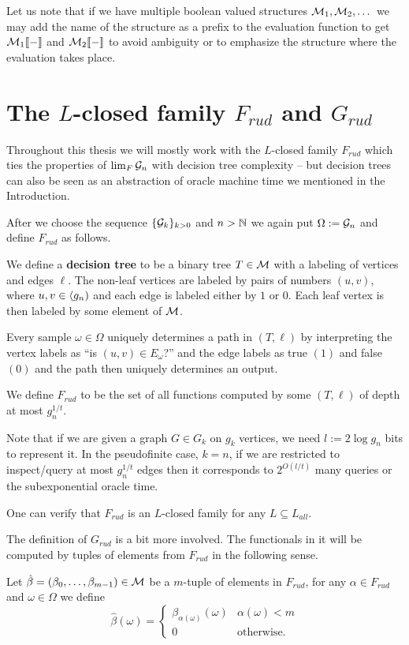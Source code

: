 Let us note that if we have multiple boolean valued structures $\mathcal{M}_1,\mathcal{M}_2,\dots$ we may add the name of the structure as a prefix to the evaluation function to get $\mathcal{M}_1\llbracket-\rrbracket$ and $\mathcal{M}_2\llbracket-\rrbracket$ to avoid ambiguity or to emphasize the structure where the evaluation takes place.
 
\section{The $L$-closed family $F_{rud}$ and $G_{rud}$}\label{secFrud}

Throughout this thesis we will mostly work with the $L$-closed family $F_{rud}$ which ties the properties of $\lim_F \mathcal{G}_n$ with decision tree complexity -- but decision trees can also be seen as an abstraction of oracle machine time we mentioned in the Introduction.

After we choose the sequence $\{\mathcal{G}_k\}_{k>0}$ and $n>\mathbb{N}$ we again put $\Omega:=\mathcal{G}_n$ and define $F_{rud}$ as follows.

\begin{defi}
We define a \textbf{decision tree} to be a binary tree $T\in\mathcal{M}$ with a labeling of vertices and edges $\ell$. The non-leaf vertices are labeled by pairs of numbers $(u,v)$, where $u,v\in\langle g_n)$ and each edge is labeled either by $1$ or $0$. Each leaf vertex is then labeled by some element of $\mathcal{M}$.

Every sample $\omega\in\Omega$ uniquely determines a path in $(T,\ell)$ by interpreting the vertex labels as ``is $(u,v)\in E_\omega$?'' and the edge labels as true $(1)$ and false $(0)$ and the path then uniquely determines an output.

We define $F_{rud}$ to be the set of all functions computed by some $(T,\ell)$ of depth at most $g_n^{1/t}$.
\end{defi}

Note that if we are given a graph $G\in G_k$ on $g_k$ vertices, we need $l:=2\log g_n$ bits to represent it. In the pseudofinite case, $k=n$, if we are restricted to inspect/query at most $g_n^{1/t}$ edges then it corresponds to $2^{O(l/t)}$ many queries or the subexponential oracle time.

One can verify that $F_{rud}$ is an $L$-closed family for any $L\subseteq L_{all}$.

The definition of $G_{rud}$ is a bit more involved. The functionals in it will be computed by tuples of elements from $F_{rud}$ in the following sense.

\begin{defi}
Let $\hat\beta=(\beta_0,\dots,\beta_{m-1})\in\mathcal{M}$ be a $m$-tuple of elements in $F_{rud}$, for any $\alpha\in F_{rud}$ and $\omega\in\Omega$ we define
\[\hat\beta(\omega)=
\begin{cases}
\beta_{\alpha(\omega)}(\omega)&\alpha(\omega)<m\\
0&\text{otherwise.}
\end{cases}\]
\end{defi}

